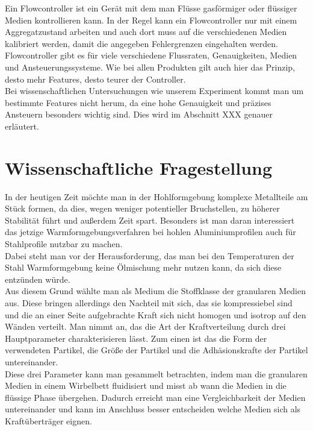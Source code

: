 Ein Flowcontroller ist ein Gerät mit dem man Flüsse gasförmiger oder flüssiger Medien kontrollieren kann. In der Regel kann ein Flowcontroller nur mit einem Aggregatzustand arbeiten und auch dort muss auf die verschiedenen Medien kalibriert werden, damit die angegeben Fehlergrenzen eingehalten werden. \\
Flowcontroller gibt es für viele verschiedene Flussraten, Genauigkeiten, Medien und Ansteuerungssysteme. Wie bei allen Produkten gilt auch hier das Prinzip, desto mehr Features, desto teurer der Controller. \\
Bei wissenschaftlichen Untersuchungen wie unserem Experiment kommt man um bestimmte Features nicht herum, da eine hohe Genauigkeit und präzises Ansteuern besonders wichtig sind. Dies wird im Abschnitt XXX genauer erläutert.



\section{Wissenschaftliche Fragestellung}

In der heutigen Zeit möchte man in der Hohlformgebung komplexe Metallteile am Stück formen, da dies, wegen weniger potentieller Bruchstellen, zu höherer Stabilität führt und außerdem Zeit spart. Besonders ist man daran interessiert das jetzige Warmformgebungsverfahren bei hohlen Aluminiumprofilen auch für Stahlprofile nutzbar zu machen. \\
Dabei steht man vor der Herausforderung, das man bei den Temperaturen der Stahl Warmformgebung keine Ölmischung mehr nutzen kann, da sich diese entzünden würde. \\
Aus diesem Grund wählte man als Medium die Stoffklasse der granularen Medien aus. Diese bringen allerdings den Nachteil mit sich, das sie kompressiebel sind und die an einer Seite aufgebrachte Kraft sich nicht homogen und isotrop auf den Wänden verteilt. 
Man nimmt an, das die Art der Kraftverteilung durch drei Hauptparameter charakterisieren lässt. Zum einen ist das die Form der verwendeten Partikel, die Größe der Partikel und die Adhäsionskrafte der Partikel untereinander. \\
Diese drei Parameter kann man gesammelt betrachten, indem man die granularen Medien in einem Wirbelbett fluidisiert und misst ab wann die Medien in die flüssige Phase übergehen. Dadurch erreicht man eine Vergleichbarkeit der Medien untereinander und kann im Anschluss besser entscheiden welche Medien sich als Kraftüberträger eignen. \\


